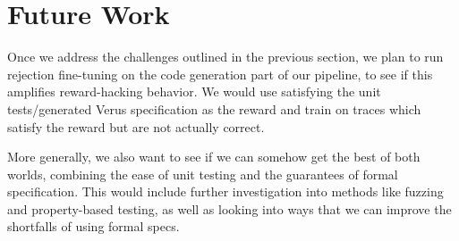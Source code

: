 \section{Future Work}
\label{futurework}

Once we address the challenges outlined in the previous section, 
we plan to run rejection fine-tuning on the code generation part of our pipeline, 
to see if this amplifies reward-hacking behavior.
We would use satisfying the unit tests/generated Verus specification as the reward
and train on traces which satisfy the reward but are not actually correct. 

More generally, we also want to see if we can somehow get the best of both worlds,
combining the ease of unit testing and the guarantees of formal specification. 
This would include further investigation into methods like fuzzing and property-based testing, 
as well as looking into ways that we can improve the shortfalls of using formal specs.